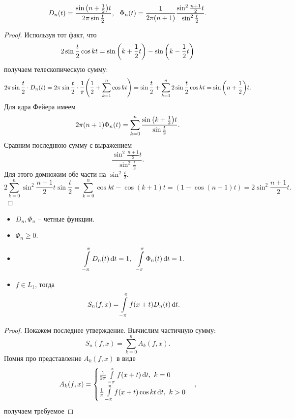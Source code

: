 \begin{lemma}
    \[
        D_n(t) = \frac{\sin{\parens*{n + \frac{1}{2}} t}}{2 \pi \sin{\frac{t}{2}}},~~
        \Phi_n(t) = \frac{1}{2\pi (n + 1)} \frac{\sin^2{\frac{n + 1}{2} t}}{\sin^2{\frac{t}{2}}}
    .\]
\end{lemma}
\begin{proof}
    Используя тот факт, что
    \[
        2 \sin{\frac{t}{2} \cos{kt}} = \sin{\parens*{k + \frac{1}{2} t}}
        - \sin{\parens*{k - \frac{1}{2} t}}
    \]
    получаем телескопическую сумму:
    \begin{align*}
        2 \pi \sin{\frac{t}{2}} \cdot D_n(t) = 2 \pi \sin{\frac{t}{2}} \cdot
        \frac{1}{\pi} \parens*{\frac{1}{2} + \sum_{k = 1}^n{\cos{kt}}} =
        \sin{\frac{t}{2}} + \sum_{k = 1}^n{2 \sin{\frac{t}{2}} \cos{kt}} =
        \sin{\parens*{n + \frac{1}{2}} t}
    .\end{align*}
    Для ядра Фейера имеем
    \[
        2\pi (n + 1) \Phi_n(t) = \sum_{k = 0}^n{\frac{\sin{\parens*{k + \frac{1}{2}} t}}
        {\sin{\frac{t}{2}}}}
    .\]
    Сравним последнюю сумму с выражением
    \[
        \frac{\sin^2{\frac{n + 1}{2} t}}{\sin^2{\frac{t}{2}}}
    .\]
    Для этого домножим обе части на $\sin^2{\frac{t}{2}}$.
    \[
        2 \sum_{k = 0}^n{\sin^2{\frac{n + 1}{2} t} \sin{\frac{t}{2}}} =
        \sum_{k = 0}^n{\cos{kt} - \cos{(k + 1) t}} = (1 - \cos{(n + 1) t}) =
        2 \sin^2{\frac{n + 1}{2} t}
    .\]
\end{proof}

\begin{corollary}
    \enewline
    \begin{itemize}
        \item $D_n, \Phi_n$ -- четные функции.
        \item $\Phi_n \geqslant 0$.
        \item
            \[
                \intl_{-\pi}^\pi{D_n(t) \dd t} = 1,~~
                \intl_{-\pi}^\pi{\Phi_n(t) \dd t} = 1
            .\]
        \item $f \in L_1$, тогда
            \[
                S_n(f, x) = \intl_{-\pi}^\pi{f(x + t) D_n(t) \dd t} 
            .\]
    \end{itemize}
\end{corollary}
\begin{proof}
    Покажем последнее утверждение. Вычислим частичную сумму:
    \[
        S_n(f, x) = \sum_{k = 0}^n{A_k(f, x)} 
    .\]
    Помня про представление $A_k(f, x)$ в виде
    \[
        A_k(f, x) = \begin{cases}
            \frac{1}{2\pi} \intl_{-\pi}^\pi{f(x + t) \dd t},~ k = 0 \\
            \frac{1}{\pi} \intl_{-\pi}^\pi{f(x + t) \cos{kt} \dd t},~ k > 0
        \end{cases}
    ,\]
    получаем требуемое
\end{proof}

